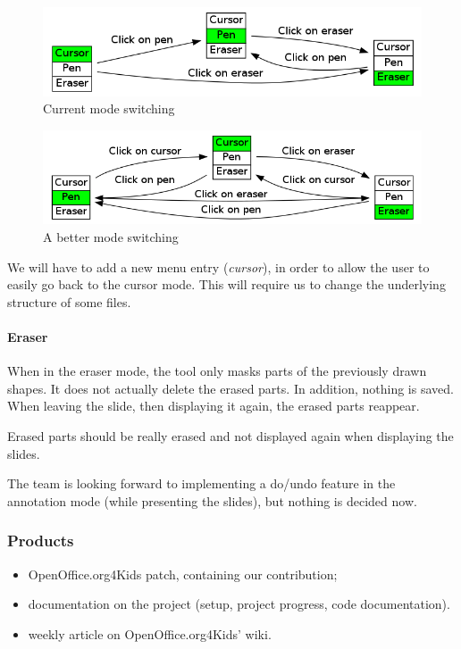 \documentclass[a4paper,11pt]{article}
\begin{document}
\begin{figure}[!h]
\centering
\includegraphics[scale=0.5]{images/modes_current.png}
\caption{Current mode switching}
\end{figure}

\begin{figure}[!h]
\centering
\includegraphics[scale=0.5]{images/modes.png}
\caption{A better mode switching}
\end{figure}

We will have to add a new menu entry (\emph{cursor}), in order to allow the
user to easily go back to the cursor mode. This will require us to change the
underlying structure of some files.

\paragraph*{Eraser}

When in the eraser mode, the tool only masks parts of the previously drawn
shapes. It does not actually delete the erased parts. In addition, nothing is
saved. When leaving the slide, then displaying it again, the erased parts
reappear.

Erased parts should be really erased and not displayed again when displaying
the slides.

The team is looking forward to implementing a do/undo feature in the
annotation mode (while presenting the slides), but nothing is decided now.

\subsubsection*{Products}

\begin{itemize}
\item OpenOffice.org4Kids patch, containing our contribution;
\item documentation on the project (setup, project progress, code documentation).
\item weekly article on OpenOffice.org4Kids' wiki.
\end{itemize}
\end{document}
